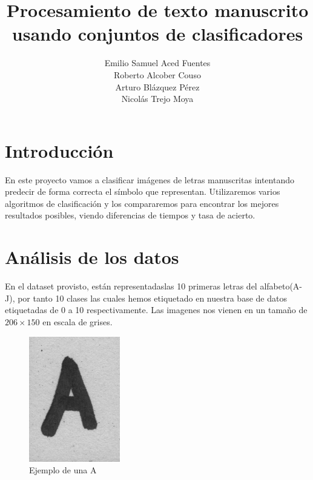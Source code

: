\documentclass[8pt,a4paper]{article}
\begin{document}
\title{Procesamiento de texto manuscrito usando conjuntos de clasificadores}

\author{
Emilio Samuel Aced Fuentes \\
Roberto Alcober Couso \\
Arturo Bl\'azquez P\'erez \\
Nicol\'as Trejo Moya \\
}

\maketitle

\section{Introducci\'on}
En este proyecto vamos a clasificar im\'agenes de letras manuscritas intentando predecir de forma correcta el s\'imbolo que representan.
Utilizaremos varios algoritmos de clasificaci\'on y los compararemos para encontrar los mejores resultados posibles, viendo diferencias de tiempos y  tasa de acierto.


\section{An\'alisis de los datos}
En el dataset provisto, est\'an representadaslas 10 primeras letras del alfabeto(A-J), por tanto 10 clases las cuales hemos etiquetado en nuestra base de datos etiquetadas de 0 a 10 respectivamente.
Las imagenes nos vienen en un tamaño de $206\times150$ en escala de grises.


\begin{figure}[htbp]
	\centering
    \includegraphics[scale=0.5]{./sin_procesar/l00000_A.png}
    \caption{Ejemplo de una A}
\end{figure}
\end{document}

